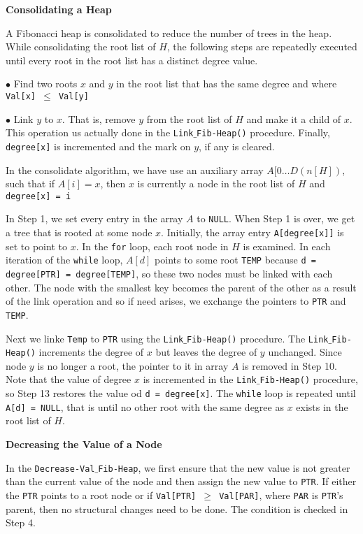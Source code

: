 \vskip 3mm
{\bf Consolidating a Heap}

\vskip 1mm
A Fibonacci heap is consolidated to reduce the number of trees in the heap. While consolidating the root list of $H$, the following steps are repeatedly executed until every root in the root list has a distinct degree value.

\vskip 2mm
\qquad$\bullet$ Find two roots $x$ and $y$ in the root list that has the same degree and where {\tt Val[x] $\leq$ Val[y]}

\vskip 3mm
\qquad$\bullet$ Link $y$ to $x$. That is, remove $y$ from the root list of $H$ and make it a child of $x$. This operation us actually done in the {\tt Link$\_$Fib-Heap()} procedure. Finally, {\tt degree[x]} is incremented and the mark on $y$, if any is cleared.

\vskip 1mm
In the consolidate algorithm, we have use an auxiliary array $A[0\ldots D(n[H])$, such that if $A[i] = x$, then $x$ is currently a node in the root list of $H$ and {\tt degree[x] = i}

\vskip 1mm
In Step 1, we set every entry in the array $A$ to {\tt NULL}. When Step 1 is over, we get a tree that is rooted at some node $x$. Initially, the array entry {\tt A[degree[x]]} is set to point to $x$. In the {\tt for} loop, each root node in $H$ is examined. In each iteration of the {\tt while} loop, $A[d]$ points to some root {\tt TEMP} because {\tt d = degree[PTR] = degree[TEMP]}, so these two nodes must be linked with each other. The node with the smallest key becomes the parent of the other as a result of the link operation and so if need arises, we exchange the pointers to {\tt PTR} and {\tt TEMP}.

\vskip 1mm
Next we linke {\tt Temp} to {\tt PTR} using the {\tt Link$\_$Fib-Heap()} procedure. The {\tt Link$\_$Fib-Heap()} increments the degree of $x$ but leaves the degree of $y$ unchanged. Since node $y$ is no longer a root, the pointer to it in array $A$ is removed in Step 10. Note that the value of degree $x$ is incremented in the {\tt Link$\_$Fib-Heap()} procedure, so Step 13 restores the value od {\tt d = degree[x]}. The {\tt while} loop is repeated until {\tt A[d] = NULL}, that is until no other root with the same degree as $x$ exists in the root list of $H$.

\vskip 3mm
{\bf Decreasing the Value of a Node}

\vskip 1mm
In the {\tt Decrease-Val$\_$Fib-Heap}, we first ensure that the new value is not greater than the current value of the node and then assign the new value to {\tt PTR}. If either the {\tt PTR} points to a root node or if {\tt Val[PTR] $\geq$ Val[PAR]}, where {\tt PAR} is {\tt PTR}'s parent, then no structural changes need to be done. The condition is checked in Step 4.

